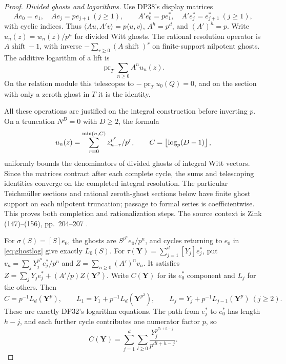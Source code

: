 \documentclass[11pt,a4paper]{article}
\theoremstyle{definition}\newtheorem{remark}[theorem]{Remark}
\begin{document}
\begin{proof}
\emph{Divided ghosts and logarithms.}
Use DP38's display matrices
\[
 Ae_0=e_1,\quad Ae_j=pe_{j+1}\ (j\ge1),\qquad
 A'e_0^*=pe_1^*,\quad A'e_j^*=e_{j+1}^*\ (j\ge1),
\]
with cyclic indices. Thus $\langle Au,A'v\rangle=p\langle u,v\rangle$,
$A^h=p^d$, and $(A')^h=p$. Write $u_n(z)=w_n(z)/p^n$ for divided Witt ghosts. The rational resolution operator is $A\operatorname{shift}-1$, with inverse
$-\sum_{r\ge0}(A\operatorname{shift})^r$ on finite-support nilpotent ghosts. The additive logarithm of a lift is
\begin{equation}\label{eq:ghostlog}
 \operatorname{pr}_T\sum_{n\ge0}A^nu_n(z).
\end{equation}
On the relation module this telescopes to $-\operatorname{pr}_Tu_0(Q)=0$, and on the section with only a zeroth ghost in $T$ it is the identity.

All these operations are justified on the integral construction before inverting $p$. On a truncation $N^D=0$ with $D\ge2$, the formula
\[
 u_n(z)=\sum_{r=0}^{\min(n,C)}
              z_{n-r}^{p^r}/p^r,\qquad C=\left\lfloor \log_p(D-1)\right\rfloor,
\]
uniformly bounds the denominators of divided ghosts of integral Witt vectors. Since the matrices contract after each complete cycle, the sums and telescoping identities converge on the completed integral resolution. The particular Teichm\"uller sections and rational zeroth-ghost sections below have finite ghost support on each nilpotent truncation; passage to formal series is coefficientwise. This proves both completion and rationalization steps. The source context is Zink (147)--(156), pp.~204--207 \cite{Zink}.

For $\sigma(S)=[S]e_0$, the ghosts are $S^{p^n}e_0/p^n$, and cycles returning to $e_0$ in \eqref{eq:ghostlog} give exactly $L_0(S)$. For $\tau(\mathbf Y)=\sum_{j=1}^d[Y_j]e_j^*$, put
$v_n=\sum_jY_j^{p^n}e_j^*/p^n$ and
$Z=\sum_{n\ge0}(A')^nv_n$. It satisfies
$Z=\sum_jY_je_j^*+(A'/p)Z(\mathbf Y^p)$.
Write $C(\mathbf Y)$ for its $e_0^*$ component and $L_j$ for the others. Then
\[
 C=p^{-1}L_d(\mathbf Y^p),\qquad
 L_1=Y_1+p^{-1}L_d(\mathbf Y^{p^2}),\qquad
 L_j=Y_j+p^{-1}L_{j-1}(\mathbf Y^p)\ (j\ge2).
\]
These are exactly DP32's logarithm equations. The path from $e_j^*$ to $e_0^*$ has length $h-j$, and each further cycle contributes one numerator factor $p$, so
\[
 C(\mathbf Y)=\sum_{j=1}^d\sum_{l\ge0}
                \frac{Y_j^{p^{lh+h-j}}}{p^{dl+h-j}}.
\]


\end{proof}
\end{document}
